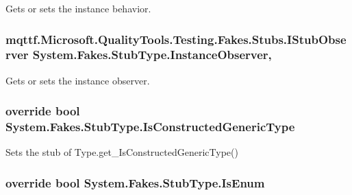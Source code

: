 Gets or sets the instance behavior.

\hypertarget{class_system_1_1_fakes_1_1_stub_type_a6793a6f12f655bb934a60e761fd24d53}{
\subsubsection[{Instance\-Observer}]{\setlength{\rightskip}{0pt plus 5cm}mqttf.\-Microsoft.\-Quality\-Tools.\-Testing.\-Fakes.\-Stubs.\-I\-Stub\-Observer System.\-Fakes.\-Stub\-Type.\-Instance\-Observer\hspace{0.3cm}{\ttfamily [get]}, {\ttfamily [set]}}}\label{class_system_1_1_fakes_1_1_stub_type_a6793a6f12f655bb934a60e761fd24d53}


Gets or sets the instance observer.

\hypertarget{class_system_1_1_fakes_1_1_stub_type_a511be1f73c60f51e963c626c127f2247}{
\subsubsection[{Is\-Constructed\-Generic\-Type}]{\setlength{\rightskip}{0pt plus 5cm}override bool System.\-Fakes.\-Stub\-Type.\-Is\-Constructed\-Generic\-Type\hspace{0.3cm}{\ttfamily [get]}}}\label{class_system_1_1_fakes_1_1_stub_type_a511be1f73c60f51e963c626c127f2247}


Sets the stub of Type.\-get\-\_\-\-Is\-Constructed\-Generic\-Type()

\hypertarget{class_system_1_1_fakes_1_1_stub_type_aca783785beb29bdfb1d76fb7bd8bdbb7}{
\subsubsection[{Is\-Enum}]{\setlength{\rightskip}{0pt plus 5cm}override bool System.\-Fakes.\-Stub\-Type.\-Is\-Enum\hspace{0.3cm}{\ttfamily [get]}}}\label{class_system_1_1_fakes_1_1_stub_type_aca783785beb29bdfb1d76fb7bd8bdbb7}


